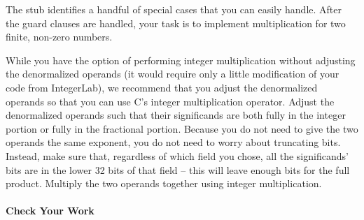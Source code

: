     The  stub identifies a handful of special cases that you can easily handle.
    After the guard clauses are handled, your task is to implement multiplication for two finite, non-zero numbers.

    While you have the option of performing integer multiplication without adjusting the denormalized operands (it would require only a little modification of your code from IntegerLab), we recommend that you adjust the denormalized operands so that you can use C's integer multiplication operator.
    Adjust the denormalized operands such that their significands are both fully in the integer portion or fully in the fractional portion.
    Because you do not need to give the two operands the same exponent, you do not need to worry about truncating bits.
    Instead, make sure that, regardless of which field you chose, all the significands' bits are in the lower 32 bits of that field -- this will leave enough bits for the full product.
    Multiply the two operands together using integer multiplication.

    \paragraph*{Check Your Work}

